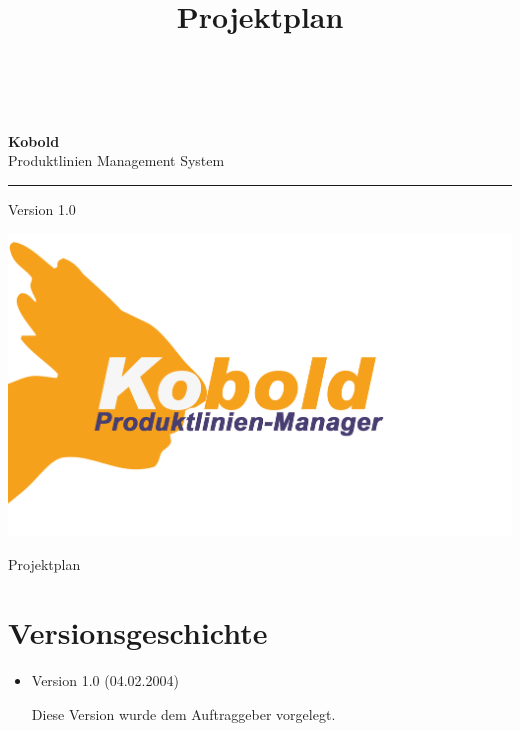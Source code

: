 \documentclass[a4paper,titlepage,12pt,ngerman]{scrbook}
\title {\huge \product\\[0.5cm]\large Projektplan \\[0.5cm] \version
  \\[1cm] \Large \company}
\newcommand\version{Version 1.0\xspace}
\begin{document}

\begin{titlepage}
\renewcommand{\thefootnote}{\fnsymbol{footnote}}
{\Huge
\raggedright
\textbf{\bf Kobold} \\
\huge Produktlinien Management System
\rule{\textwidth}{0.75pt}
\par
}
\begin{flushleft}
\normalsize
\version
\end{flushleft}

\vspace*{3cm}
\begin{center}
\includegraphics[width=15cm]{../common/logo-color.png}
\end{center}
\vfill

{\parindent=0cm
\Huge Projektplan
}


\setcounter{footnote}{0}
\end{titlepage}


\section*{Versionsgeschichte}

\begin{itemize}

\item Version 1.0 (04.02.2004)

  Diese Version wurde dem Auftraggeber vorgelegt.

\end{itemize}
\end{document}
